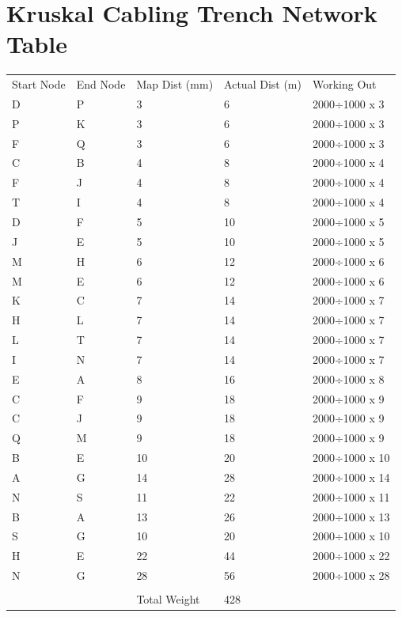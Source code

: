 \documentclass[11pt]{book}
\renewcommand{\=}[1]{\stackrel{#1}{=}} %
\theoremstyle{definition}
\theoremstyle{remark}
\begin{document}
\section{Kruskal Cabling Trench Network Table}
\begin{table}[]
\begin{tabular}{lllll}
Start Node & End Node & Map Dist (mm) & Actual Dist (m) & Working Out \\
D & P & 3 & 6 & 2000÷1000 x 3 \\
P & K & 3 & 6 & 2000÷1000 x 3 \\
F & Q & 3 & 6 & 2000÷1000 x 3 \\
C & B & 4 & 8 & 2000÷1000 x 4 \\
F & J & 4 & 8 & 2000÷1000 x 4 \\
T & I & 4 & 8 & 2000÷1000 x 4 \\
D & F & 5 & 10 & 2000÷1000 x 5 \\
J & E & 5 & 10 & 2000÷1000 x 5 \\
M & H & 6 & 12 & 2000÷1000 x 6 \\
M & E & 6 & 12 & 2000÷1000 x 6 \\
K & C & 7 & 14 & 2000÷1000 x 7 \\
H & L & 7 & 14 & 2000÷1000 x 7 \\
L & T & 7 & 14 & 2000÷1000 x 7 \\
I & N & 7 & 14 & 2000÷1000 x 7 \\
E & A & 8 & 16 & 2000÷1000 x 8 \\
C & F & 9 & 18 & 2000÷1000 x 9 \\
C & J & 9 & 18 & 2000÷1000 x 9 \\
Q & M & 9 & 18 & 2000÷1000 x 9 \\
B & E & 10 & 20 & 2000÷1000 x 10 \\
A & G & 14 & 28 & 2000÷1000 x 14 \\
N & S & 11 & 22 & 2000÷1000 x 11 \\
B & A & 13 & 26 & 2000÷1000 x 13 \\
S & G & 10 & 20 & 2000÷1000 x 10 \\
H & E & 22 & 44 & 2000÷1000 x 22 \\
N & G & 28 & 56 & 2000÷1000 x 28 \\
 &  &  &  &  \\
 &  & Total Weight & 428 & 
\end{tabular}
\end{table}
\end{document}
